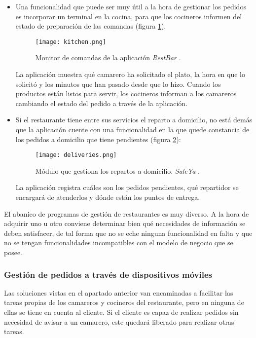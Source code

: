 \begin{itemize}
    \item Una funcionalidad que puede ser muy útil a la hora de gestionar
    los pedidos es incorporar un terminal en la cocina, para que los cocineros
    informen del estado de preparación de las comandas (figura
    \ref{fig:kitchen}).

    \begin{figure}[!h]
      \begin{center}
        \texttt{[image: kitchen.png]}
        \caption{Monitor de comandas de la aplicación \emph{RestBar}
        \cite{bib:restBar}.}
        \label{fig:kitchen}
      \end{center}
    \end{figure}
    
    La aplicación muestra qué camarero ha solicitado el plato, la hora en que
    lo solicitó y los minutos que han pasado desde que lo hizo. Cuando los
    productos están listos para servir, los cocineros informan a los
    camareros cambiando el estado del pedido a través de la aplicación.

    \item Si el restaurante tiene entre sus servicios el reparto a
    domicilio, no está demás que la aplicación cuente con una funcionalidad
    en la que quede constancia de los pedidos a domicilio que tiene pendientes
    (figura \ref{fig:deliveries}):

    \begin{figure}[!h]
      \begin{center}
        \texttt{[image: deliveries.png]}
        \caption{Módulo que gestiona los repartos a domicilio. \emph{SaleYa}
        \cite{bib:saleYa}.}
        \label{fig:deliveries}
      \end{center}
    \end{figure}

    La aplicación registra cuáles son los pedidos pendientes, qué repartidor
    se encargará de atenderlos y dónde están los puntos de entrega.
    \end{itemize}

    El abanico de programas de gestión de restaurantes es muy diverso. A la
    hora de adquirir uno u otro conviene determinar bien qué necesidades de
    información se deben satisfacer, de tal forma que no se eche ninguna
    funcionalidad en falta y que no se tengan funcionalidades incompatibles
    con el modelo de negocio que se posee.

    \subsubsection{Gestión de pedidos a través de dispositivos móviles}
    Las soluciones vistas en el apartado anterior van encaminadas a
    facilitar las tareas propias de los camareros y cocineros del restaurante,
    pero en ninguna de ellas se tiene en cuenta al cliente. Si el cliente es
    capaz de realizar pedidos sin necesidad de avisar a un camarero, este
    quedará liberado para realizar otras tareas.

